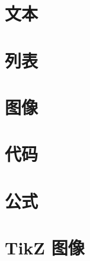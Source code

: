 \section{文本}



\section{列表}



\section{图像}



\section{代码}



\section{公式}



\section{TikZ 图像}




